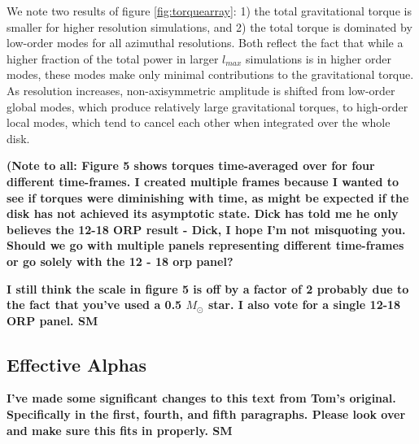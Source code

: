 \documentclass[manuscript]{aastex}
\begin{document}
We note two results of figure \ref{fig:torquearray}: 1) the total gravitational torque is smaller for higher resolution simulations, and 2) the total torque is dominated by low-order modes for all azimuthal resolutions. Both reflect the fact that while a higher fraction of the total power in larger $l_{max}$ simulations is in higher order modes, these modes make only minimal contributions to the gravitational torque. As resolution increases, non-axisymmetric amplitude is shifted from low-order global modes, which produce relatively large gravitational torques, to high-order local modes, which tend to cancel each other when integrated over the whole disk. 

{\bf (Note to all: Figure 5 shows torques
time-averaged over for four different time-frames.  I created multiple frames because I wanted to see if torques were 
diminishing with time, as might be expected if the disk has not achieved its asymptotic state.  
Dick has told me he only believes the 12-18 ORP result - Dick, I hope 
I'm not misquoting you. Should we go with multiple panels representing different time-frames or 
go solely with the 12 - 18 orp panel?
} 

{\bf I still think the scale in figure 5 is off by a factor of 2 probably due to the fact that you've used a 0.5 $M_\odot$ star. I also vote for a single 12-18 ORP panel. SM}

\subsection{Effective Alphas}


{\bf I've made some significant changes to this text from Tom's original. Specifically in the first, fourth, and fifth paragraphs. Please look over and make sure this fits in properly. SM}
\end{document}
